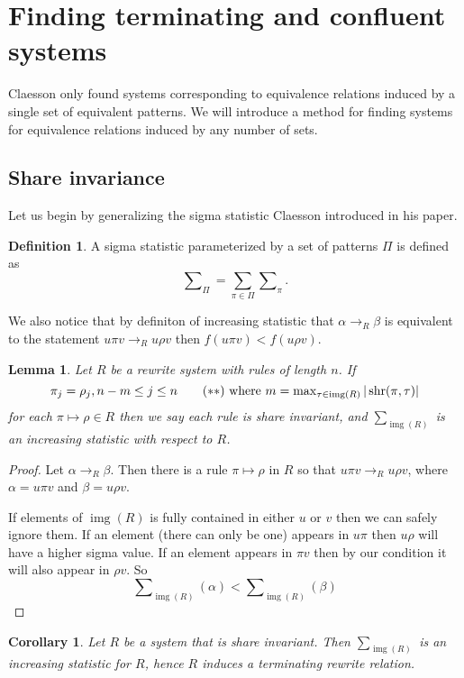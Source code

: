 \documentclass[a4paper, 11pt, english]{article}
\newcommand{\patternrule}{ \mapsto \!}
\newtheorem{lemma}[theorem]{Lemma}
\newtheorem{corollary}[theorem]{Corollary}
\theoremstyle{definition}
\newtheorem{definition}[theorem]{Definition}
\DeclareMathOperator{\img}{img}
\DeclareMathOperator{\shr}{shr}
\begin{document}
\section{Finding terminating and confluent systems}
Claesson only found systems corresponding to equivalence relations induced by a
single set of equivalent patterns. We will introduce a method for finding
systems for equivalence relations induced by any number of sets.

\subsection{Share invariance}
Let us begin by generalizing the sigma statistic Claesson introduced in his paper.

\begin{definition}
    A sigma statistic parameterized by a set of patterns $\Pi$ is defined as
    $$
        \sum\nolimits_\Pi = \sum_{\pi \in \Pi} \sum\nolimits_{\pi}.
    $$
\end{definition}

We also notice that by definiton of increasing statistic that
$\alpha \to_R \beta$ is equivalent to the statement $u \pi v \to_R u \rho v$
then $f(u \pi v) < f(u \rho v)$.

\begin{lemma}
    Let $R$ be a rewrite system with rules of length $n$. If
    \[
        \pi_j = \rho_j, n-m \leq j \leq n \tag{$\ast\ast$} \  \textnormal{where}
        \ m = \max\nolimits_{\tau \in \img(R)} |\shr(\pi, \tau)|\label{shareinvariance}
    \]
    for each $\pi \patternrule \rho \in R$ then we say each rule is \emph{share
    invariant}, and $\sum_{\img(R)}$ is an increasing statistic with respect to $R$. 
\end{lemma}
\begin{proof}
    Let $\alpha \to_R \beta$. Then there is a rule $\pi \patternrule \rho$ in
    $R$ so that $u \pi v \to_R u \rho v$, where $\alpha = u \pi v$ and $\beta =
    u \rho v$. 

    If elements of $\img(R)$ is fully contained in either $u$ or $v$ then we
    can safely ignore them. If an element (there can only be one) appears in $u\pi$ then
    $u \rho$ will have a higher sigma value. If an element appears in $\pi v$
    then by our condition it will also appear in $\rho v$.
    So
    \[
        \sum\nolimits_{\img(R)}(\alpha) < \sum\nolimits_{\img(R)}(\beta)
    \]
\end{proof}

\begin{corollary}
    Let $R$ be a system that is share invariant. Then $\sum_{\img(R)}$ is an
    increasing statistic for $R$, hence $R$ induces a terminating rewrite relation.
\end{corollary}
\end{document}
